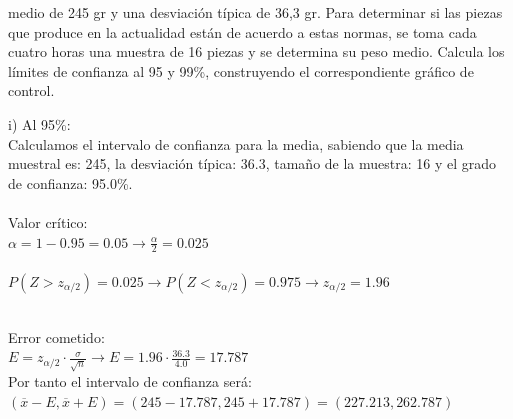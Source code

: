 \documentclass[spanish, 11pt]{exam}
\begin{document}
\begin{questions}
medio de 245
gr y una desviación típica de 36,3 gr. Para determinar si las piezas que produce en la actualidad están de
acuerdo a estas normas, se toma cada cuatro horas una muestra de 16 piezas y se determina su peso medio.
Calcula los límites de confianza al 95 y 99\%, construyendo el correspondiente gráfico de control. \begin{solution}   i) Al 95\%: \\  Calculamos el intervalo de confianza para la media, sabiendo que la media muestral es: 245, la desviación típica: 36.3, tamaño de la muestra: 16 y el grado de confianza: 95.0\%. \\ \\ Valor crítico: \\ $\alpha=1-0.95=0.05\to \frac{\alpha}{2}=0.025$ \\ \\ $P(Z>z_{\alpha/2})=0.025\to P(Z<z_{\alpha/2})=0.975 \to z_{\alpha/2} =1.96$ \\ 
     \\
    Error cometido: \\ $E=z_{\alpha/2}\cdot \frac{\sigma}{\sqrt{n}} \to E=1.96\cdot \frac{36.3}{4.0}=17.787$ \\ Por tanto el intervalo de confianza será: \\$\left(\overline{x} - E , \overline{x} + E \right)=\left(245 - 17.787 , 245 + 17.787 \right)=\left(227.213, 262.787 \right)$ \\  \\ 
\end{solution}
\end{questions}
\end{document}

